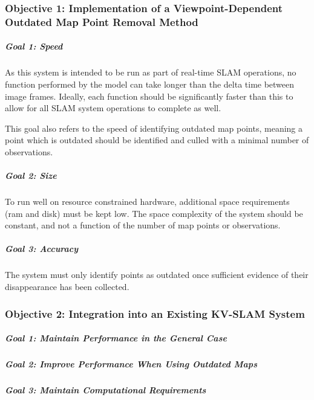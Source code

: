 \subsubsection*{Objective 1: Implementation of a Viewpoint-Dependent Outdated Map Point Removal Method}

\subparagraph{Goal 1: Speed}

As this system is intended to be run as part of real-time SLAM operations, no function performed by the model can take longer than the delta time between image frames. Ideally, each function should be significantly faster than this to allow for all SLAM system operations to complete as well.

This goal also refers to the speed of identifying outdated map points, meaning a point which is outdated should be identified and culled with a minimal number of observations.

\subparagraph{Goal 2: Size}

To run well on resource constrained hardware, additional space requirements (ram and disk) must be kept low. The space complexity of the system should be constant, and not a function of the number of map points or observations.

\subparagraph{Goal 3: Accuracy}

The system must only identify points as outdated once sufficient evidence of their disappearance has been collected. 

\subsubsection*{Objective 2: Integration into an Existing KV-SLAM System}

\subparagraph{Goal 1: Maintain Performance in the General Case}
\subparagraph{Goal 2: Improve Performance When Using Outdated Maps}
\subparagraph{Goal 3: Maintain Computational Requirements}




